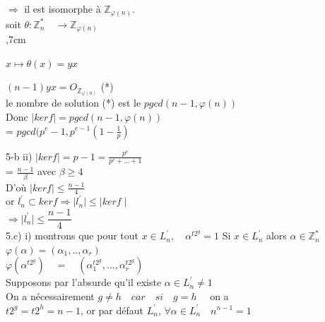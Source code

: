 \documentclass[10pt]{beamer}
\begin{document}
\begin{frame}

$ \Longrightarrow$ il est isomorphe \`a $\mathbb{Z}_{\varphi(n)}$.\\

soit $ \theta : \mathbb{Z}_n^{*}\quad \longrightarrow \mathbb{Z}_{\varphi(n)}$\\
,7cm

$x \longmapsto \theta(x)=yx$\\

\parindent=0cm

$(n-1)yx=O_{\mathbb{Z}_{\varphi(n)}}$ \quad (*)\\
le nombre de solution (*) est le $pgcd(n-1,\varphi(n))$\\
Donc $ \mid kerf\mid = pgcd (n-1,\varphi(n)) $\\

= $pgcd (p^{e}-1,p^{e-1}(1-\frac{1}{p})$\\\parindent=0cm

5-b  ii) $ \mid kerf\mid = p-1=\frac{p^{e}}{p^{e}+...+1}$\\

= $ \frac{n-1}{\beta} $ avec $\beta \geq4$\\

D'o\`u $  \mid kerf\mid \leq\frac{n-1}{4}$\\
or $l^{'}_n \subset kerf \Longrightarrow \mid l^{'}_n\mid \leq   \mid kerf\mid$ \\ 

$ \Longrightarrow \mid l^{'}_n\mid \leq \dfrac{n-1}{4}$\\

5.c) i) montrons que pour tout $ x\in L^{'}_n, \quad \alpha^{t2^{g}} =1$
Si $ x\in L^{'}_n$ alors $ \alpha\in \mathbb{Z}_n^{*}$\\

$ \varphi(\alpha)= (\alpha_1,..,\alpha_r)$\\

$\varphi(\alpha^{t2^{g}})\quad= \quad (\alpha_{1}^{t2^{g}},...,\alpha_{r}^{t2^{g}} ) $\\

Supposons par l'absurde qu'il existe $\alpha \in L^{'}_n \neq 1$\\
On a n\'ecessairement $g \neq h \quad car\quad si\quad g=h \quad$ on a \\
$t2^{g}=t2^{h}= n-1$, or par d\'efaut
$L^{'}_n$, $\forall \alpha \in L^{'}_n \quad n^{n-1}=1$\\


\end{frame}
\end{document}
